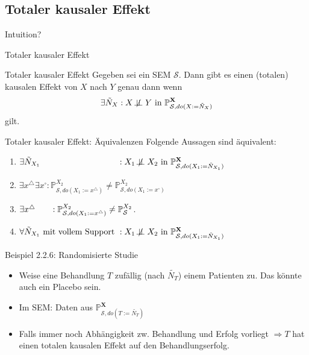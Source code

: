 \subsection{Totaler kausaler Effekt}
\begin{frame}{}{}
    \begin{center}
       {\Huge Intuition?}
    \end{center}
\end{frame}

\begin{frame}{Totaler kausaler Effekt}
    \begin{block}{Totaler kausaler Effekt}
        Gegeben sei ein SEM $\mathcal{S}$. Dann gibt es einen
        (totalen) kausalen Effekt von $X$ nach $Y$ genau dann wenn
        \[\exists \tilde{N}_X : X \not\!\perp\!\!\!\perp Y \text{ in } \mathbb{P}_{\mathcal{S}, do(X:=\tilde{N}_X)}^{\mathbf{X}}\]
        gilt.
    \end{block}
\end{frame}

\begin{frame}[t]{Totaler kausaler Effekt: Äquivalenzen}
    Folgende Aussagen sind äquivalent:

    \begin{enumerate}[label=(\roman*)]
        \item $\exists \tilde{N}_{X_1} \hphantom{\text{ mit vollem Support }}: X_1 \not\!\perp\!\!\!\perp X_2 \text{ in } \mathbb{P}_{\mathcal{S}, do(X_1:=\tilde{N}_{X_1})}^{\mathbf{X}}$
        \item $\exists x^\triangle \exists x^\square: \mathbb{P}_{\mathcal{S}, do(X_1:=x^\triangle)}^{X_2} \neq \mathbb{P}_{\mathcal{S}, do(X_1:=x^\square)}^{X_2}$
        \item $\exists x^\triangle \hphantom{\exists x^\square}: \mathbb{P}_{\mathcal{S}, do(X_1:=x^\triangle)}^{X_2} \neq \mathbb{P}_\mathcal{S}^{X_2}$.
        \item $\forall \tilde{N}_{X_1} \text{ mit vollem Support }: X_1 \not\!\perp\!\!\!\perp X_2 \text{ in } \mathbb{P}_{\mathcal{S}, do(X_1:=\tilde{N}_{X_1})}^{\mathbf{X}}$
    \end{enumerate}
\end{frame}

\begin{frame}{Beispiel 2.2.6: Randomisierte Studie}
    \begin{itemize}
        \item<1-> Weise eine Behandlung $T$ zufällig (nach $\tilde{N_T}$) einem
              Patienten zu. Das könnte auch ein Placebo sein.
        \item<2-> Im SEM: Daten aus $\mathbb{P}_{\mathcal{S}, do(T:=\tilde{N_T})}^{\mathbf{X}}$
        \item<3-> Falls immer noch Abhängigkeit zw. Behandlung und Erfolg
              vorliegt $\Rightarrow T$ hat einen totalen kausalen Effekt auf
              den Behandlungserfolg.
    \end{itemize}
\end{frame}

